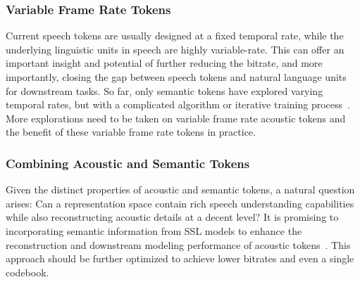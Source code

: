 \vspace{0.05in}
\subsubsection{Variable Frame Rate Tokens}
Current speech tokens are usually designed at a fixed temporal rate, while the underlying linguistic units in speech are highly variable-rate.
This can offer an important insight and potential of further reducing the bitrate, and more importantly, closing the gap between speech tokens and natural language units for downstream tasks.
So far, only semantic tokens have explored varying temporal rates, but with a complicated algorithm or iterative training process~\cite{baade2024syllablelm, cho2024sylber}.
More explorations need to be taken on variable frame rate acoustic tokens and the benefit of these variable frame rate tokens in practice.

\vspace{0.05in}
\subsubsection{Combining Acoustic and Semantic Tokens}
Given the distinct properties of acoustic and semantic tokens, a natural question arises: 
Can a representation space contain rich speech understanding capabilities while also reconstructing acoustic details at a decent level?
It is promising to incorporating semantic information from SSL models to enhance the reconstruction and downstream modeling performance of acoustic tokens~\cite{zhang2024speechtokenizer,ye2024codec,liu2024semanticodec}.
This approach should be further optimized to achieve lower bitrates and even a single codebook.

\vspace{0.05in}
